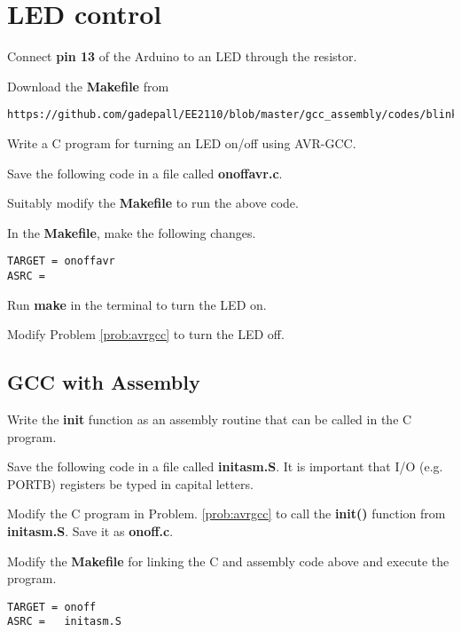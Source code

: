 \documentclass[journal,12pt,twocolumn]{IEEEtran}
\begin{document}
\section{LED control}
\begin{problem}
Connect \textbf{pin 13}  of the Arduino to an LED through the resistor.
\end{problem}
\begin{problem}
Download the \textbf{Makefile} from 
\begin{lstlisting}
https://github.com/gadepall/EE2110/blob/master/gcc_assembly/codes/blink/Makefile
\end{lstlisting}

\end{problem}
\begin{problem}
\label{prob:avrgcc}
Write a C program for turning an LED on/off using AVR-GCC.
\end{problem}
\solution Save the following code in a file called \textbf{onoffavr.c}.  

\begin{problem}
Suitably modify the \textbf{Makefile} to run the above code.
\end{problem}
\solution
In the \textbf{Makefile}, make the following changes.
\begin{lstlisting}
TARGET = onoffavr
ASRC =   
\end{lstlisting}
%
\begin{problem}
Run \textbf{make} in the terminal to turn the LED on.
\end{problem}
\begin{problem}
Modify Problem \ref{prob:avrgcc} to turn the LED off.
\end{problem}

\subsection{GCC with Assembly}
\begin{problem}
Write the \textbf{init} function as an assembly routine that can be called in the C program.
\end{problem}
\solution Save the following code in a file called \textbf{initasm.S}.  It is important that I/O (e.g. PORTB) registers be typed in capital letters.

%
\begin{problem}
\label{prob:gcc-asm}
Modify the C program in Problem. \ref{prob:avrgcc} to call the  \textbf{init()} function from  \textbf{initasm.S}. Save it as \textbf{onoff.c}.
\end{problem}
\solution

\begin{problem}
Modify the \textbf{Makefile} for linking the C and assembly code above and execute the program.
\end{problem}
\solution
\begin{lstlisting}
TARGET = onoff
ASRC =   initasm.S
\end{lstlisting}
\end{document}
